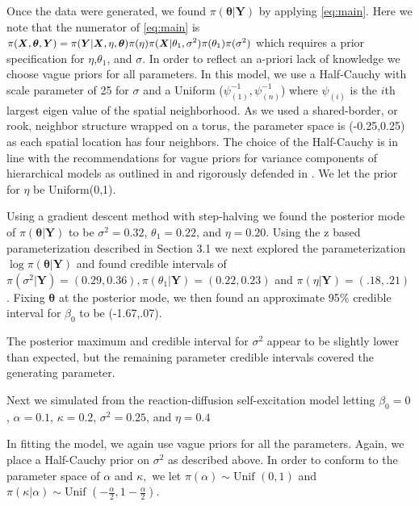 \documentclass[11pt]{isuthesis}
\begin{document}
Once the data were generated, we found $\pi(\boldsymbol{\theta}|\boldsymbol{Y})$ by applying \eqref{eq:main}.  Here we note that the numerator of \eqref{eq:main} is $\small\pi(\boldsymbol{X},\boldsymbol{\theta},\boldsymbol{Y})=\pi(\boldsymbol{Y}|\boldsymbol{X},\eta,\boldsymbol{\theta})\pi(\eta)\pi(\boldsymbol{X}|\theta_1,\sigma^2)\pi(\theta_1)\pi(\sigma^2)$ which requires a prior specification for $\eta$,$\theta_1$, and $\sigma$.  In order to reflect an a-priori lack of knowledge we choose vague priors for all parameters.   In this model, we use a Half-Cauchy with scale parameter of 25 for $\sigma$ and a Uniform ($\psi_{(1)}^{-1},\psi_{(n)}^{-1}$) where $\psi_{(i)}$ is the $i$th largest eigen value of the spatial neighborhood.  As we used a shared-border, or rook, neighbor structure wrapped on a torus, the parameter space is (-0.25,0.25) as each spatial location has four neighbors.  The choice of the Half-Cauchy is in line with the recommendations for vague priors for variance components of hierarchical models as outlined in \cite{gelman2006prior} and rigorously defended in \cite{polson2012half}.  We let the prior for $\eta$ be Uniform(0,1).  

Using a gradient descent method with step-halving we found the posterior mode of $\pi(\boldsymbol{\theta}|\boldsymbol{Y})$ to be $\sigma^2=0.32$, $\theta_1=0.22$, and $\eta=0.20$. Using the z based parameterization described in Section 3.1 we next explored the parameterization $\log\pi(\boldsymbol{\theta}|\boldsymbol{Y})$ and found credible intervals of $\pi(\sigma^2|\boldsymbol{Y})=(0.29,0.36),\pi(\theta_1|\boldsymbol{Y})=(0.22,0.23)$ and $\pi(\eta|\boldsymbol{Y})=(.18,.21)$.  Fixing $\boldsymbol{\theta}$ at the posterior mode, we then found an approximate 95\% credible interval for $\beta_0$ to be (-1.67,.07). 

The posterior maximum and credible interval for $\sigma^2$ appear to be slightly lower than expected, but the remaining parameter credible intervals covered the generating parameter.  

Next we simulated from the reaction-diffusion self-excitation model letting $\beta_0=0$, $\alpha=0.1$, $\kappa=0.2$, $\sigma^2=0.25$, and $\eta=0.4$ 

In fitting the model, we again use vague priors for all the parameters.  Again, we place a Half-Cauchy prior on $\sigma^2$ as described above.  In order to conform to the parameter space of $\alpha$ and $\kappa,$ we let $\pi(\alpha)\sim \text{Unif }(0,1)$ and $\pi(\kappa|\alpha)\sim\text{Unif }(-\frac{\alpha}{2},1-\frac{\alpha}{2})$.
\end{document}
